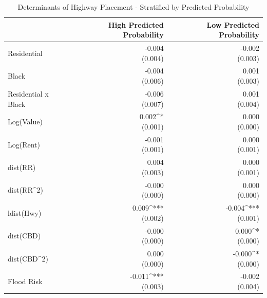 \begin{table}[h]
\centering
\caption{Determinants of Highway Placement - Stratified by Predicted Probability}
\label{tab:sample_stratified}
\begin{tabular*}{\textwidth}{@{\extracolsep{\fill}}l*{2}{r}}
\toprule
 & High Predicted Probability & Low Predicted Probability \\
\midrule
Residential & \makecell[tr]{-0.004 \\ (0.004)} & \makecell[tr]{-0.002 \\ (0.003)} \\
Black & \makecell[tr]{-0.004 \\ (0.006)} & \makecell[tr]{0.001 \\ (0.003)} \\
Residential x Black & \makecell[tr]{-0.006 \\ (0.007)} & \makecell[tr]{0.001 \\ (0.004)} \\
Log(Value) & \makecell[tr]{0.002^{*} \\ (0.001)} & \makecell[tr]{0.000 \\ (0.000)} \\
Log(Rent) & \makecell[tr]{-0.001 \\ (0.001)} & \makecell[tr]{0.000 \\ (0.001)} \\
dist(RR) & \makecell[tr]{0.004 \\ (0.003)} & \makecell[tr]{0.000 \\ (0.001)} \\
dist(RR^2) & \makecell[tr]{-0.000 \\ (0.000)} & \makecell[tr]{0.000 \\ (0.000)} \\
ldist(Hwy) & \makecell[tr]{0.009^{***} \\ (0.002)} & \makecell[tr]{-0.004^{***} \\ (0.001)} \\
dist(CBD) & \makecell[tr]{-0.000 \\ (0.000)} & \makecell[tr]{0.000^{*} \\ (0.000)} \\
dist(CBD^2) & \makecell[tr]{0.000 \\ (0.000)} & \makecell[tr]{-0.000^{*} \\ (0.000)} \\
Flood Risk & \makecell[tr]{-0.011^{***} \\ (0.003)} & \makecell[tr]{-0.002 \\ (0.004)} \\

\end{tabular*}
\end{table}
